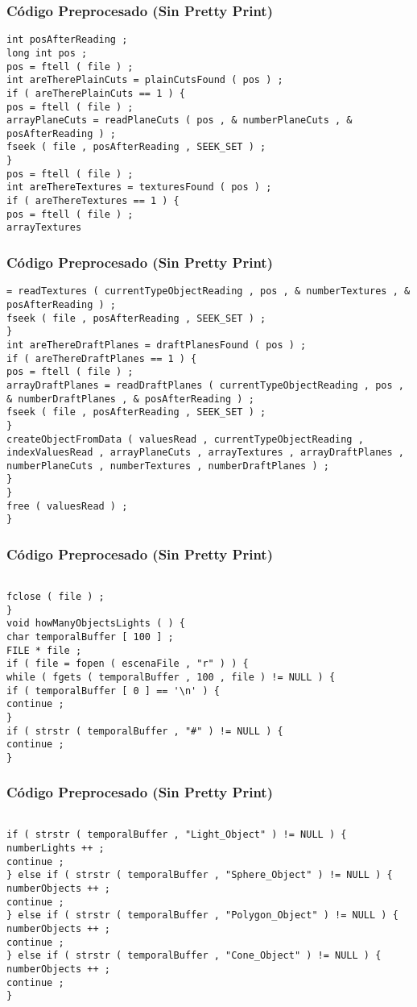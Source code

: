 \documentclass{beamer}
\begin{document}
\begin{frame}[fragile]
\frametitle{C\'odigo Preprocesado (Sin Pretty Print)}
\begin{lstlisting}[style=CStyle]
int posAfterReading ; 
long int pos ; 
pos = ftell ( file ) ; 
int areTherePlainCuts = plainCutsFound ( pos ) ; 
if ( areTherePlainCuts == 1 ) { 
pos = ftell ( file ) ; 
arrayPlaneCuts = readPlaneCuts ( pos , & numberPlaneCuts , & posAfterReading ) ; 
fseek ( file , posAfterReading , SEEK_SET ) ; 
} 
pos = ftell ( file ) ; 
int areThereTextures = texturesFound ( pos ) ; 
if ( areThereTextures == 1 ) { 
pos = ftell ( file ) ; 
arrayTextures \end{lstlisting}
\end{frame}
\begin{frame}[fragile]
\frametitle{C\'odigo Preprocesado (Sin Pretty Print)}
\begin{lstlisting}[style=CStyle]
= readTextures ( currentTypeObjectReading , pos , & numberTextures , & posAfterReading ) ; 
fseek ( file , posAfterReading , SEEK_SET ) ; 
} 
int areThereDraftPlanes = draftPlanesFound ( pos ) ; 
if ( areThereDraftPlanes == 1 ) { 
pos = ftell ( file ) ; 
arrayDraftPlanes = readDraftPlanes ( currentTypeObjectReading , pos , & numberDraftPlanes , & posAfterReading ) ; 
fseek ( file , posAfterReading , SEEK_SET ) ; 
} 
createObjectFromData ( valuesRead , currentTypeObjectReading , indexValuesRead , arrayPlaneCuts , arrayTextures , arrayDraftPlanes , numberPlaneCuts , numberTextures , numberDraftPlanes ) ; 
} 
} 
free ( valuesRead ) ; 
} \end{lstlisting}
\end{frame}
\begin{frame}[fragile]
\frametitle{C\'odigo Preprocesado (Sin Pretty Print)}
\begin{lstlisting}[style=CStyle]

fclose ( file ) ; 
} 
void howManyObjectsLights ( ) { 
char temporalBuffer [ 100 ] ; 
FILE * file ; 
if ( file = fopen ( escenaFile , "r" ) ) { 
while ( fgets ( temporalBuffer , 100 , file ) != NULL ) { 
if ( temporalBuffer [ 0 ] == '\n' ) { 
continue ; 
} 
if ( strstr ( temporalBuffer , "#" ) != NULL ) { 
continue ; 
} \end{lstlisting}
\end{frame}
\begin{frame}[fragile]
\frametitle{C\'odigo Preprocesado (Sin Pretty Print)}
\begin{lstlisting}[style=CStyle]

if ( strstr ( temporalBuffer , "Light_Object" ) != NULL ) { 
numberLights ++ ; 
continue ; 
} else if ( strstr ( temporalBuffer , "Sphere_Object" ) != NULL ) { 
numberObjects ++ ; 
continue ; 
} else if ( strstr ( temporalBuffer , "Polygon_Object" ) != NULL ) { 
numberObjects ++ ; 
continue ; 
} else if ( strstr ( temporalBuffer , "Cone_Object" ) != NULL ) { 
numberObjects ++ ; 
continue ; 
} \end{lstlisting}
\end{frame}
\end{document}
